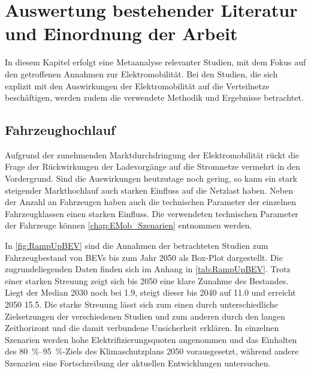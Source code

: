 
\section{Auswertung bestehender Literatur und Einordnung der Arbeit}\label{chap:Literatur}

In diesem Kapitel erfolgt eine Metaanalyse relevanter Studien, mit dem Fokus auf den getroffenen Annahmen zur Elektromobilität.
Bei den Studien, die sich explizit mit den Auswirkungen der Elektromobilität auf die Verteilnetze beschäftigen, werden zudem die verwendete Methodik und Ergebnisse betrachtet.


\subsection{Fahrzeughochlauf}

Aufgrund der zunehmenden Marktdurchdringung der Elektromobilität rückt die Frage der Rückwirkungen der Ladevorgänge auf die Stromnetze vermehrt in den Vordergrund.
Sind die Auswirkungen heutzutage noch gering, so kann ein stark steigender Markthochlauf auch starken Einfluss auf die Netzlast haben.
Neben der Anzahl an Fahrzeugen haben auch die technischen Parameter der einzelnen Fahrzeugklassen einen starken Einfluss.
Die verwendeten technischen Parameter der Fahrzeuge können \autoref{chap:EMob_Szenarien} entnommen werden.\medskip

In \autoref{fig:RampUpBEV} sind die Annahmen der betrachteten Studien zum Fahrzeugbestand von \glspl{BEV} bis zum Jahr \num{2050} als Box-Plot dargestellt.
Die zugrundeliegenden Daten finden sich im Anhang in \autoref{tab:RampUpBEV}.
Trotz einer starken Streuung zeigt sich bis \num{2050} eine klare Zunahme des Bestandes.
Liegt der Median 2030 noch bei \SI{1.9}{\MioStk}, steigt dieser bis \num{2040} auf \SI{11.0}{\Mio} und erreicht \num{2050} \SI{15.5}{\Mio}.
Die starke Streuung lässt sich zum einen durch unterschiedliche Zielsetzungen der verschiedenen Studien und zum anderen durch den langen Zeithorizont und die damit verbundene Unsicherheit erklären.
In einzelnen Szenarien werden hohe Elektrifizierungsquoten angenommen und das Einhalten des \SIrange[range-phrase=~{--}~]{80}{95}{\percent}-Ziels des Klimaschutzplans \num{2050} \cite{BMU2016} vorausgesetzt, während andere Szenarien eine Fortschreibung der aktuellen Entwicklungen untersuchen.



\clearpage

